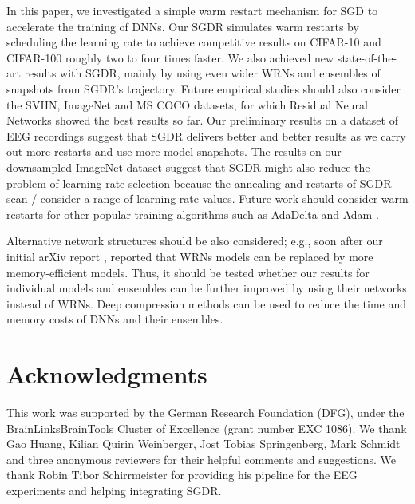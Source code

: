 \documentclass{article} %
\begin{document}
In this paper, we investigated a simple warm restart mechanism for SGD to accelerate the training of DNNs. Our SGDR simulates warm restarts by scheduling the learning rate to achieve competitive results on CIFAR-10 and CIFAR-100 roughly two to four times faster. We also achieved new state-of-the-art results with SGDR, mainly by using even wider WRNs and ensembles of snapshots from SGDR's trajectory. Future empirical studies should also consider the SVHN, ImageNet and MS COCO datasets, for which Residual Neural Networks showed the best results so far. Our preliminary results on a dataset of EEG recordings suggest that SGDR delivers better and better results as we carry out more restarts and use more model snapshots. 
The results on our downsampled ImageNet dataset suggest that SGDR might also reduce the problem of learning rate selection because the annealing and restarts of SGDR scan / consider a range of learning rate values. Future work should consider warm restarts for other popular training algorithms such as AdaDelta \citep{zeiler2012adadelta} and Adam \citep{kingma2014adam}. 

Alternative network structures should be also considered; e.g., 
soon after our initial arXiv report \citep{loshchilov2016sgdr}, \cite{2016arXiv160802908Z,huang2016densely,han2016deep} reported that WRNs models can be replaced by more memory-efficient models. Thus, it should be tested whether our results for individual models and ensembles can be further improved by using their networks instead of WRNs. Deep compression methods \citep{han2015deep} can be used to reduce the time and memory costs of DNNs and their ensembles. 


\section{Acknowledgments}

This work was supported by the German Research Foundation (DFG), under the BrainLinksBrainTools
Cluster of Excellence (grant number EXC 1086).
We thank Gao Huang, Kilian Quirin Weinberger,	Jost Tobias Springenberg, Mark Schmidt and three anonymous reviewers for their helpful comments and suggestions. We thank Robin Tibor Schirrmeister for providing his pipeline for the EEG experiments and helping integrating SGDR. 
\end{document}
